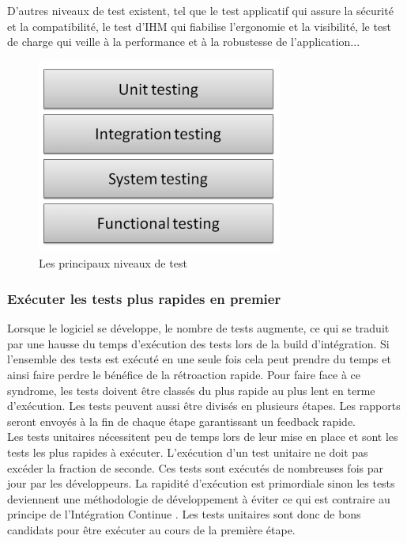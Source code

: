        D’autres niveaux de test existent, tel que le test applicatif qui assure la sécurité et la compatibilité, le test d’IHM qui fiabilise l’ergonomie et la visibilité, le test de charge qui veille à la performance et à la robustesse de l’application...

       \begin{figure}
         \begin{center}
           \includegraphics[scale=0.7]{images/testingLevels.png}
         \end{center}
         \caption{Les principaux niveaux de test}
         \label{Testing levels}
       \end{figure}

      \subsubsection{Exécuter les tests plus rapides en premier}
      Lorsque le logiciel se développe, le nombre de tests augmente, ce qui se traduit par une hausse du temps d’exécution des tests lors de la build d’intégration. Si l’ensemble des tests est exécuté en une seule fois cela peut prendre du temps et ainsi faire perdre le bénéfice de la rétroaction rapide. Pour faire face à ce syndrome, les tests doivent être classés du plus rapide au plus lent en terme d’exécution. Les tests peuvent aussi être divisés en plusieurs étapes. Les rapports seront envoyés à la fin de chaque étape garantissant un feedback rapide.\\

      Les tests unitaires nécessitent peu de temps lors de leur mise en place et sont les tests les plus rapides à exécuter. L’exécution d’un test unitaire ne doit pas excéder la fraction de seconde. Ces tests sont exécutés de nombreuses fois par jour par les développeurs. La rapidité d’exécution est primordiale sinon les tests deviennent une méthodologie de développement à éviter ce qui est contraire au principe de l’Intégration Continue \cite{Duv07}. Les tests unitaires sont donc de bons candidats pour être exécuter au cours de la première étape.\\

